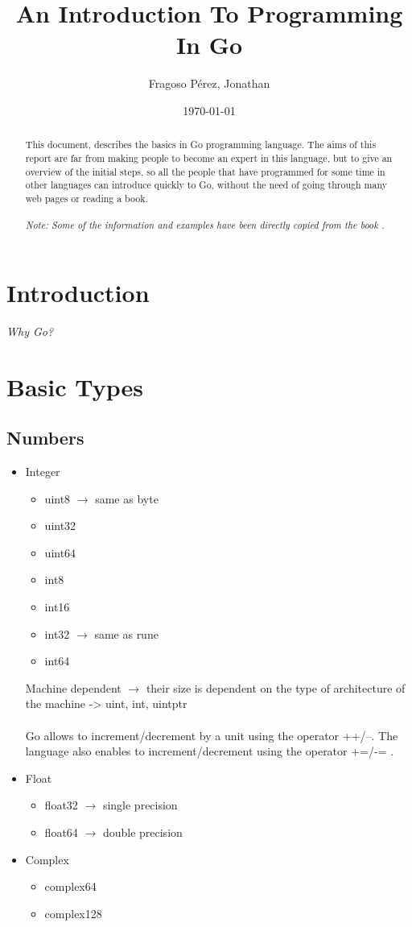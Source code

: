 \documentclass[twoside,a4paper,english]{report}
\title{An Introduction To Programming In Go}
\author{Fragoso Pérez, Jonathan}
\date{\today}
\begin{document}
\renewcommand{\abstractname}{Abstract}

\maketitle

\begin{abstract}
This document, describes the basics in Go programming language. The aims of this report are far from making people to become an expert in this language, but to give an overview of the initial steps, so all the people that have programmed for some time in other languages can introduce quickly to Go, without the need of going through many web pages or reading a book.\\\\
\emph{Note: Some of the information and examples have been directly copied from the book \cite{doxsey2012introduction}.}
\end{abstract}


\newpage
\chapter{Introduction}
\emph{Why Go? } 

\chapter{Basic Types}
\section{Numbers}
\begin{itemize}
\item Integer
\begin{itemize}
\item uint8 $\rightarrow$ same as byte
\item uint32	
\item uint64
\item int8 
\item int16
\item int32 $\rightarrow$ same as rune
\item int64
\end{itemize}
Machine dependent $\rightarrow$ their size is dependent on the type of architecture of the machine -> uint, int, uintptr \\\\
Go allows to increment/decrement by a unit using the operator ++/--. The language also enables to increment/decrement using the operator +=/-= .
\item Float
\begin{itemize}
\item float32 $\rightarrow$ single precision
\item float64 $\rightarrow$ double precision
\end{itemize}
\item Complex
\begin{itemize}
\item complex64
\item complex128
\end{itemize}
\end{itemize}
\end{document}
